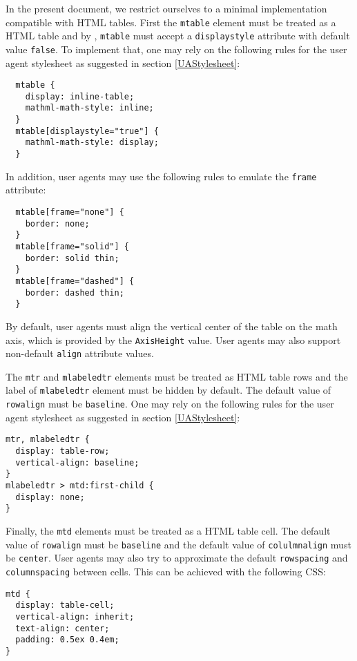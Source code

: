 In the present document, we restrict ourselves to a minimal implementation
compatible with HTML tables. First the {\tt mtable} element must be treated as
a HTML table and by \cite{MathML3}, {\tt mtable} must accept a
{\tt displaystyle} attribute with default value {\tt false}. To implement that,
one may rely on the following rules for the user agent stylesheet as
suggested in section \ref{UAStylesheet}:
%
\begin{lstlisting}
  mtable {
    display: inline-table;
    mathml-math-style: inline;
  }
  mtable[displaystyle="true"] {
    mathml-math-style: display;
  }
\end{lstlisting}
%

In addition, user agents may use the following rules to emulate the {\tt frame}
attribute:
%
\begin{lstlisting}
  mtable[frame="none"] {
    border: none;
  }
  mtable[frame="solid"] {
    border: solid thin;
  }
  mtable[frame="dashed"] {
    border: dashed thin;
  }
\end{lstlisting}
%

By default, user agents must align the vertical center of the table on the
math axis, which is provided by the {\tt AxisHeight} value.
User agents may also support non-default {\tt align} attribute values.

The {\tt mtr} and {\tt mlabeledtr} elements must be treated as HTML table rows
and the label of {\tt mlabeledtr} element must be hidden by default.
The default value of {\tt rowalign} must be {\tt baseline}.
One may rely on the following rules for the user agent stylesheet
as suggested in section \ref{UAStylesheet}:

%
\begin{lstlisting}
mtr, mlabeledtr {
  display: table-row;
  vertical-align: baseline;
}
mlabeledtr > mtd:first-child {
  display: none;
}
\end{lstlisting}
%

Finally, the {\tt mtd} elements must be treated as a HTML table cell.
The default value of {\tt rowalign} must be {\tt baseline} and
the default value of {\tt colulmnalign} must be {\tt center}.
User agents may also try to approximate the default {\tt rowspacing} and
{\tt columnspacing} between cells. This can be achieved with the following CSS:

%
\begin{lstlisting}
mtd {
  display: table-cell;
  vertical-align: inherit;
  text-align: center;
  padding: 0.5ex 0.4em;
}
\end{lstlisting}
%

